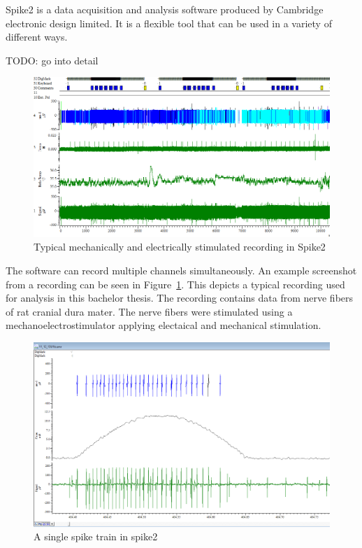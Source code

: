 Spike2 is a data acquisition and analysis software produced by Cambridge electronic design limited. It is a flexible tool that can be used in a variety of different ways.

TODO: go into detail\\

\begin{figure}
	\includegraphics[width = \textwidth]{src/pic/Spike2_screenshot}
	\caption{Typical mechanically and electrically stimulated recording in Spike2}
	\label{fig:spike2}
\end{figure}

The software can record multiple channels simultaneously. An example screenshot from a recording can be seen in Figure~\ref{fig:spike2}. This depicts a typical recording used for analysis in this bachelor thesis. The recording contains data from nerve fibers of rat cranial dura mater. The nerve fibers were stimulated using a mechanoelectrostimulator applying electaical and mechanical stimulation. 

\begin{figure}
	\includegraphics[width = \textwidth]{src/pic/Spike2_spike_train}
	\caption{A single spike train in spike2}
	\label{fig:spike_train}
\end{figure}

